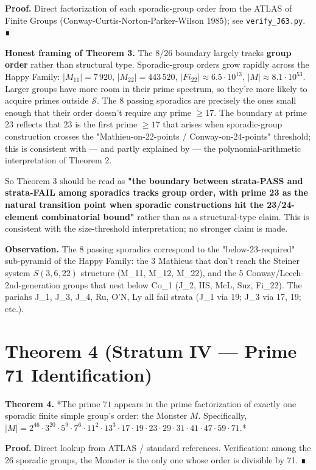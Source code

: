 \documentclass[11pt,reqno]{amsart}
\theoremstyle{plain}
\theoremstyle{definition}
\begin{document}
\textbf{Proof.} Direct factorization of each sporadic-group order from the ATLAS of Finite Groups (Conway-Curtis-Norton-Parker-Wilson 1985); see \texttt{verify_J63.py}. ∎

\textbf{Honest framing of Theorem 3.} The 8/26 boundary largely tracks \textbf{group order} rather than structural type. Sporadic-group orders grow rapidly across the Happy Family: $|M_{11}| = 7\,920$, $|M_{22}| = 443\,520$, $|Fi_{22}| \approx 6.5 \cdot 10^{13}$, $|M| \approx 8.1 \cdot 10^{53}$. Larger groups have more room in their prime spectrum, so they're more likely to acquire primes outside $\mathcal{S}$. The 8 passing sporadics are precisely the ones small enough that their order doesn't require any prime $\geq 17$. The boundary at prime 23 reflects that 23 is the first prime $\geq 17$ that arises when sporadic-group construction crosses the "Mathieu-on-22-points / Conway-on-24-points" threshold; this is consistent with --- and partly explained by --- the polynomial-arithmetic interpretation of Theorem 2.

So Theorem 3 should be read as \textbf{"the boundary between strata-PASS and strata-FAIL among sporadics tracks group order, with prime 23 as the natural transition point when sporadic constructions hit the 23/24-element combinatorial bound"} rather than as a structural-type claim. This is consistent with the size-threshold interpretation; no stronger claim is made.

\textbf{Observation.} The 8 passing sporadics correspond to the "below-23-required" sub-pyramid of the Happy Family: the 3 Mathieus that don't reach the Steiner system $S(3,6,22)$ structure (M_11, M_12, M_22), and the 5 Conway/Leech-2nd-generation groups that nest below Co_1 (J_2, HS, McL, Suz, Fi_22). The pariahs J_1, J_3, J_4, Ru, O'N, Ly all fail strata (J_1 via 19; J_3 via 17, 19; etc.).

\section{Theorem 4 (Stratum IV --- Prime 71 Identification)}

\textbf{Theorem 4.} *The prime $71$ appears in the prime factorization of exactly one sporadic finite simple group's order: the Monster $M$. Specifically, $|M| = 2^{46} \cdot 3^{20} \cdot 5^9 \cdot 7^6 \cdot 11^2 \cdot 13^3 \cdot 17 \cdot 19 \cdot 23 \cdot 29 \cdot 31 \cdot 41 \cdot 47 \cdot 59 \cdot 71$.*

\textbf{Proof.} Direct lookup from ATLAS / standard references. Verification: among the 26 sporadic groups, the Monster is the only one whose order is divisible by 71. ∎
\end{document}
